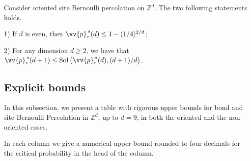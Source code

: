 \documentclass{aptpub}
\newcommand{\Z}{\mathbb{Z}}
\DeclareMathOperator{\Sol}{Sol}
\begin{document}
\begin{thm}\label{theo:siteO}
Consider oriented site Bernoulli percolation on $\Z^d$. The two following statements holds.

1) If $d$ is even, then $ \vv{p}_c^{\,s}(d) \leq 1-(1/4)^{2/d}$;

2) For any dimension $d \geq 2$, we have that $\vv{p}_c^{\,s}(d+1) \leq \Sol\big(\vv{p}^{\,s}_c(d),(d+1)/d \big)$. 


\end{thm}



\subsection{Explicit bounds}\label{sec:comments}

In this subsection, we present a table with rigorous upper bounds for bond and site  Bernoulli Percolation in $\Z^ d$, up to $d=9$, in both the oriented and the non-oriented cases. 

In each column we give a numerical upper bound rounded to four decimals for the critical probability in the head of the column.
\end{document}
